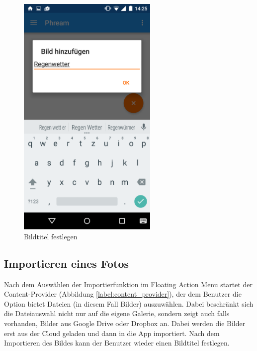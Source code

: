 \begin{figure}[H]
\begin{minipage}{0.4\textwidth}
	\includegraphics[width=0.6\textwidth]{images/screenshots/camera_imagetitle.png}
	\caption{Bildtitel festlegen}
	\label{label:camera_imagetitle}
	\end{minipage}
\end{figure}

\subsection{Importieren eines Fotos}
Nach dem Auswählen der Importierfunktion im Floating Action Menu startet der Content-Provider (Abbildung \ref{label:content_provider}), der dem Benutzer die Option bietet Dateien (in diesem Fall Bilder) auszuwählen. Dabei beschränkt sich die Dateiauswahl nicht nur auf die eigene Galerie, sondern zeigt auch falls vorhanden, Bilder aus Google Drive oder Dropbox an. Dabei werden die Bilder erst aus der Cloud geladen und dann in die App importiert. Nach dem Importieren des Bildes kann der Benutzer wieder einen Bildtitel festlegen.

